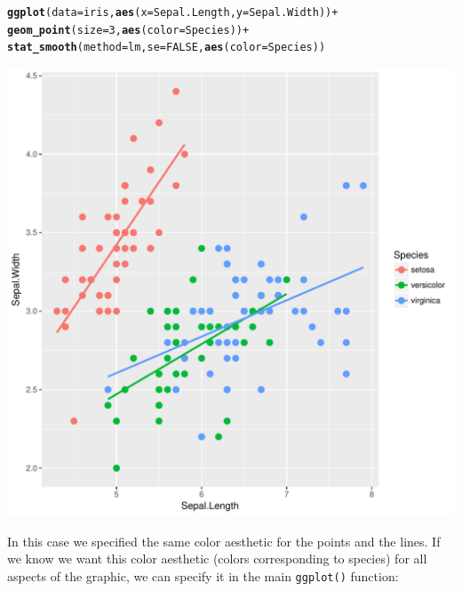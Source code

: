 \documentclass[12pt,oneside]{book}\usepackage[]{graphicx}\usepackage[]{color}
\makeatletter
\def\maxwidth{ %
  \ifdim\Gin@nat@width>\linewidth
    \linewidth
  \else
    \Gin@nat@width
  \fi
}
\newcommand{\hlnum}[1]{\textcolor[rgb]{0.686,0.059,0.569}{#1}}%
\newcommand{\hlopt}[1]{\textcolor[rgb]{0,0,0}{#1}}%
\newcommand{\hlstd}[1]{\textcolor[rgb]{0.345,0.345,0.345}{#1}}%
\newcommand{\hlkwc}[1]{\textcolor[rgb]{0.333,0.667,0.333}{#1}}%
\newcommand{\hlkwd}[1]{\textcolor[rgb]{0.737,0.353,0.396}{\textbf{#1}}}%
\newenvironment{kframe}{%
 \def\at@end@of@kframe{}%
 \ifinner\ifhmode%
  \def\at@end@of@kframe{\end{minipage}}%
  \begin{minipage}{\columnwidth}%
 \fi\fi%
 \def\FrameCommand##1{\hskip\@totalleftmargin \hskip-\fboxsep
 \colorbox{shadecolor}{##1}\hskip-\fboxsep
     \hskip-\linewidth \hskip-\@totalleftmargin \hskip\columnwidth}%
 \MakeFramed {\advance\hsize-\width
   \@totalleftmargin\z@ \linewidth\hsize
   \@setminipage}}%
 {\par\unskip\endMakeFramed%
 \at@end@of@kframe}
\newenvironment{knitrout}{}{} %
\makeatother
\begin{document}
\begin{knitrout}
\color{fgcolor}\begin{kframe}
\begin{alltt}
\hlkwd{ggplot}\hlstd{(}\hlkwc{data} \hlstd{= iris,} \hlkwd{aes}\hlstd{(}\hlkwc{x} \hlstd{= Sepal.Length,} \hlkwc{y} \hlstd{= Sepal.Width))} \hlopt{+}
    \hlkwd{geom_point}\hlstd{(}\hlkwc{size}\hlstd{=}\hlnum{3}\hlstd{,} \hlkwd{aes}\hlstd{(}\hlkwc{color}\hlstd{=Species))} \hlopt{+}
    \hlkwd{stat_smooth}\hlstd{(}\hlkwc{method} \hlstd{= lm,} \hlkwc{se}\hlstd{=}\hlnum{FALSE}\hlstd{,} \hlkwd{aes}\hlstd{(}\hlkwc{color}\hlstd{=Species))}
\end{alltt}
\end{kframe}
\includegraphics[width=\maxwidth]{figure/unnamed-chunk-66-1} 

\end{knitrout}
In this case we specified the same color aesthetic for the points and the lines. If we know we want this color aesthetic (colors corresponding to species) for all aspects of the graphic, we can specify it in the main \verb+ggplot()+ function:
\end{document}

